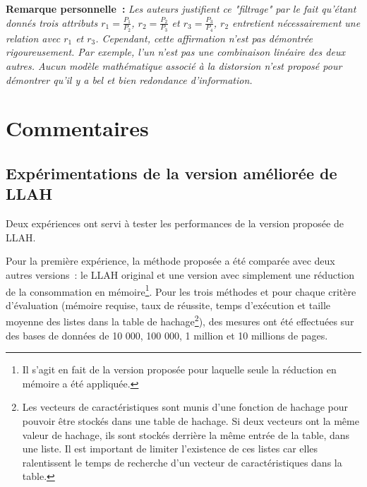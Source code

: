 \documentclass[a4paper]{article}
\begin{document}
\textbf{Remarque personnelle~:} \textit{Les auteurs justifient ce "filtrage" par le fait qu'étant donnés trois attributs $r_1 = \frac{P_1}{P_2}$, $r_2 = \frac{P_2}{P_3}$ et $r_3 = \frac{P_3}{P_4}$, $r_2$ entretient nécessairement une relation avec $r_1$ et $r_3$. Cependant, cette affirmation n'est pas démontrée rigoureusement. Par exemple, l'un n'est pas une combinaison linéaire des deux autres. Aucun modèle mathématique associé à la distorsion n'est proposé pour démontrer qu'il y a bel et bien redondance d'information.}


\section{Commentaires}

\subsection{Expérimentations de la version améliorée de LLAH}
Deux expériences ont servi à tester les performances de la version proposée de LLAH.

Pour la première expérience, la méthode proposée a été comparée avec deux autres versions~: le LLAH original et une version avec simplement une réduction de la consommation en mémoire\footnote{Il s'agit en fait de la version proposée pour laquelle seule la réduction en mémoire a été appliquée.}. Pour les trois méthodes et pour chaque critère d'évaluation (mémoire requise, taux de réussite, temps d'exécution et taille moyenne des listes dans la table de hachage\footnote{Les vecteurs de caractéristiques sont munis d'une fonction de hachage pour pouvoir être stockés dans une table de hachage. Si deux vecteurs ont la même valeur de hachage, ils sont stockés derrière la même entrée de la table, dans une liste. Il est important de limiter l'existence de ces listes car elles ralentissent le temps de recherche d'un vecteur de caractéristiques dans la table.}), des mesures ont été effectuées sur des bases de données de 10 000, 100 000, 1 million et 10 millions de pages.
\end{document}
